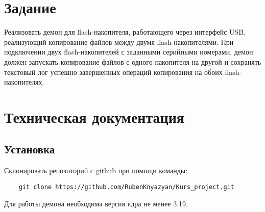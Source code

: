 \documentclass[12pt,a4paper]{scrartcl}
\begin{document}
\section{Задание}
	Реализовать демон для flash-накопителя, работающего через интерфейс USB, реализующий  копирование файлов между двумя flash-накопителями. При подключении двух flash-накопителей с заданными серийными номерами, демон должен запускать копирование файлов с одного накопителя на другой и сохранять текстовый лог успешно завершенных операций копирования на обоих flash-накопителях.
\section{Техническая документация}
\subsection{Установка}
	Склонировать репозиторий с github при помощи команды: \begin{verbatim}
	git clone https://github.com/RubenKnyazyan/Kurs_project.git
	\end{verbatim}Для работы демона необходима версия ядра не менее 3.19.
\end{document}
